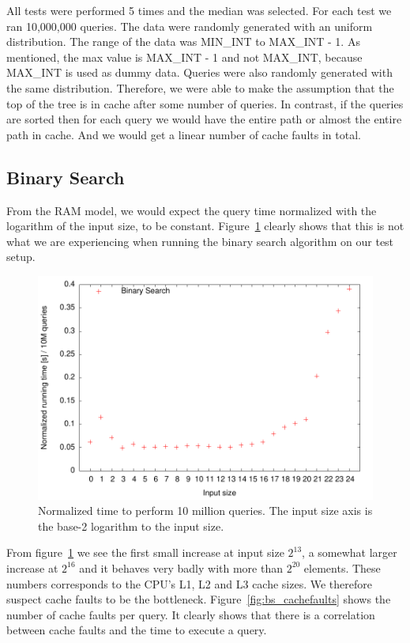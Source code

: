 All tests were performed 5 times and the median was selected. For each
test we ran 10,000,000 queries. The data were randomly generated with
an uniform distribution. The range of the data was MIN\_INT to
MAX\_INT - 1. As mentioned, the max value is MAX\_INT - 1 and not
MAX\_INT, because MAX\_INT is used as dummy data. Queries were also
randomly generated with the same distribution. Therefore, we were able
to make the assumption that the top of the tree is in cache after some
number of queries. In contrast, if the queries are sorted then for
each query we would have the entire path or almost the entire path in
cache. And we would get a linear number of cache faults in total.

\subsection{Binary Search}
From the RAM model, we would expect the query time normalized with the
logarithm of the input size, to be
constant. Figure~\ref{fig:bs_runningtime} clearly shows that this is
not what we are experiencing when running the binary search algorithm on our
test setup.

\begin{figure}[h!]
  \centering
  \includegraphics[width=\textwidth]{../week1/plots/outputs/bs_runningtime}
  \caption{Normalized time to perform 10 million queries. The input
    size axis is the base-2 logarithm to the input size.}
  \label{fig:bs_runningtime}
\end{figure}

From figure~\ref{fig:bs_runningtime} we see the first small increase
at input size \(2^{13}\), a somewhat larger increase at \(2^{16}\)
and it behaves very badly with more than \(2^{20}\) elements.
These numbers corresponds to the CPU's L1, L2 and L3 cache sizes. We
therefore suspect cache faults to be the
bottleneck. Figure~\ref{fig:bs_cachefaults} shows the number of cache
faults per query. It clearly shows that there is a correlation between cache faults and the time to execute a query.

